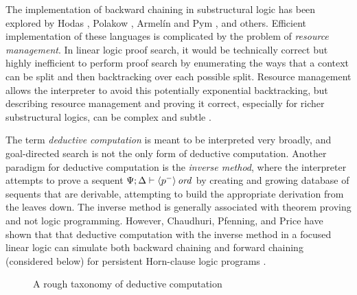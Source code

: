 The implementation of backward chaining in substructural logic has
been explored by Hodas \cite{hodas94logic}, Polakow
\cite{polakow00linear,polakow01ordered}, Armel\'in and Pym
\cite{armelin01bunched}, and others. Efficient implementation of these
languages is complicated by the problem of {\it resource
  management}. In linear logic proof search, it would be technically
correct but highly inefficient to perform proof search by enumerating
the ways that a context can be split and then backtracking over each
possible split. Resource management allows the interpreter to avoid
this potentially exponential backtracking, but describing resource
management and proving it correct, especially for richer substructural
logics, can be complex and subtle \cite{cervesato00efficient}.

The term {\it deductive computation} is meant to be interpreted very
broadly, and goal-directed search is not the only form of deductive
computation. Another paradigm for deductive computation is the {\it
  inverse method}, where the interpreter attempts to prove a sequent
${\Psi};{\Delta} \vdash {{\langle {p^-} \rangle}\,{{\it ord}}} \mathstrut$ by creating and growing
database of sequents that are derivable, attempting to build the
appropriate derivation from the leaves down. The inverse method is
generally associated with theorem proving and not logic
programming. However, Chaudhuri, Pfenning, and Price have shown that
that deductive computation with the inverse method in a focused linear
logic can simulate both backward chaining and forward chaining
(considered below) for persistent Horn-clause logic programs
\cite{chaudhuri10logical}. 

\begin{figure}
\caption{A rough taxonomy of deductive computation}
\label{fig:computation-taxonomy}
\end{figure}

